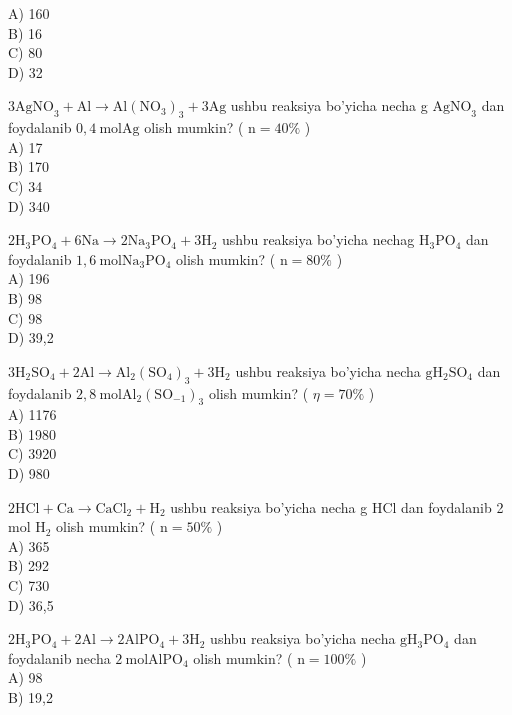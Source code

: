 A) 160\\
B) 16\\
C) 80\\
D) 32
  \item $3 \mathrm{AgNO}_{3}+\mathrm{Al} \rightarrow \mathrm{Al}\left(\mathrm{NO}_{3}\right)_{3}+3 \mathrm{Ag}$ ushbu reaksiya bo'yicha necha g $\mathrm{AgNO}_{3}$ dan foydalanib $0,4 \mathrm{~mol} \mathrm{Ag}$ olish mumkin? ( $\mathrm{n}=40 \%$ )\\
A) 17\\
B) 170\\
C) 34\\
D) 340
  \item $2 \mathrm{H}_{3} \mathrm{PO}_{4}+6 \mathrm{Na} \rightarrow 2 \mathrm{Na}_{3} \mathrm{PO}_{4}+3 \mathrm{H}_{2}$ ushbu reaksiya bo'yicha nechag $\mathrm{H}_{3} \mathrm{PO}_{4}$ dan foydalanib $1,6 \mathrm{~mol} \mathrm{Na}_{3} \mathrm{PO}_{4}$ olish mumkin? ( $\mathrm{n}=80 \%$ )\\
A) 196\\
B) 98\\
C) 98\\
D) 39,2
  \item $3 \mathrm{H}_{2} \mathrm{SO}_{4}+2 \mathrm{Al} \rightarrow \mathrm{Al}_{2}\left(\mathrm{SO}_{4}\right)_{3}+3 \mathrm{H}_{2}$ ushbu reaksiya bo'yicha necha $\mathrm{g} \mathrm{H}_{2} \mathrm{SO}_{4}$ dan foydalanib $2,8 \mathrm{~mol} \mathrm{Al}_{2}\left(\mathrm{SO}_{-1}\right)_{3}$ olish mumkin? ( $\eta=70 \%$ )\\
A) 1176\\
B) 1980\\
C) 3920\\
D) 980
  \item $2 \mathrm{HCl}+\mathrm{Ca} \rightarrow \mathrm{CaCl}_{2}+\mathrm{H}_{2}$ ushbu reaksiya bo'yicha necha g HCl dan foydalanib 2 mol $\mathrm{H}_{2}$ olish mumkin? ( $\mathrm{n}=50 \%$ )\\
A) 365\\
B) 292\\
C) 730\\
D) 36,5
  \item $2 \mathrm{H}_{3} \mathrm{PO}_{4}+2 \mathrm{Al} \rightarrow 2 \mathrm{AlPO}_{4}+3 \mathrm{H}_{2}$ ushbu reaksiya bo'yicha necha $\mathrm{g} \mathrm{H}_{3} \mathrm{PO}_{4}$ dan foydalanib necha $2 \mathrm{~mol} \mathrm{AlPO}_{4}$ olish mumkin? ( $\mathrm{n}=100 \%$ )\\
A) 98\\
B) 19,2\\
